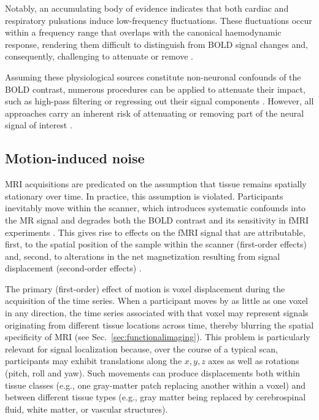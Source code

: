 Notably, an accumulating body of evidence indicates that both cardiac and respiratory pulsations induce low-frequency fluctuations. These fluctuations occur within a frequency range that overlaps with the canonical haemodynamic response, rendering them difficult to distinguish from BOLD signal changes and, consequently, challenging to attenuate or remove \citep{birnSeparatingRespiratoryvariationrelatedFluctuations2006,changRelationshipRespirationEndtidal2009, changEffectsModelbasedPhysiological2009,shmueliLowfrequencyFluctuationsCardiac2007}.

Assuming these physiological sources constitute non-neuronal confounds of the BOLD contrast, numerous procedures can be applied to attenuate their impact, such as high-pass filtering or regressing out their signal components \citep{caballero2017methods}. However, all approaches carry an inherent risk of attenuating or removing part of the neural signal of interest \citep{caballero2017methods, addehPhysiologicalConfoundsBOLDfMRI2025}.




\subsection{Motion-induced noise}
\label{sub:motion}

    

MRI acquisitions are predicated on the assumption that tissue remains spatially stationary over time. In practice, this assumption is violated. Participants inevitably move within the scanner, which introduces systematic confounds into the MR signal and degrades both the BOLD contrast and its sensitivity in fMRI experiments \citep{satterthwaite2019motion,fristonMovementRelatedEffectsFMRI1996}. This gives rise to effects on the fMRI signal that are attributable, first, to the spatial position of the sample within the scanner (first-order effects) and, second, to alterations in the net magnetization resulting from signal displacement (second-order effects) \citep{fristonMovementRelatedEffectsFMRI1996}.

The primary (first-order) effect of motion is voxel displacement during the acquisition of the time series. When a participant moves by as little as one voxel in any direction, the time series associated with that voxel may represent signals originating from different tissue locations across time, thereby blurring the spatial specificity of MRI (see Sec.~\ref{sec:functionalimaging}). This problem is particularly relevant for signal localization because, over the course of a typical scan, participants may exhibit translations along the $x,y,z$ axes as well as rotations (pitch, roll and yaw). Such movements can produce displacements both within tissue classes (e.g., one gray-matter patch replacing another within a voxel) and between different tissue types (e.g., gray matter being replaced by cerebrospinal fluid, white matter, or vascular structures).

